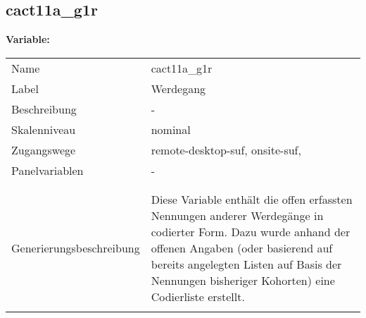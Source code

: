 	
	
	\subsection{cact11a\_g1r}
	\label{subSection:cact11a_g1r}

	\noindent\textbf{Variable:}\\
		\begin{tabular}{lL{11.3cm}}
			\label{tableVariable:cact11a_g1r}
			Name & cact11a\_g1r \\
			Label & Werdegang \\
			Beschreibung & - \\
			Skalenniveau & nominal \\
			Zugangswege &
				remote-desktop-suf,
				onsite-suf,
 \\
			Panelvariablen & -
			 \\
			 \\
 \\
					Generierungsbeschreibung & Diese Variable enthält die offen erfassten Nennungen anderer Werdegänge in codierter Form. Dazu wurde anhand der offenen Angaben (oder basierend auf bereits angelegten Listen auf Basis der Nennungen bisheriger Kohorten) eine Codierliste erstellt.
				 \\	
			 \\
		\end{tabular}






